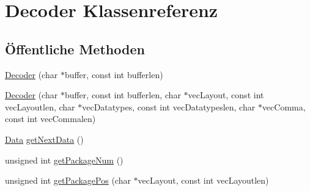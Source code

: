 \hypertarget{classDecoder}{\section{Decoder Klassenreferenz}
\label{classDecoder}
}
\subsection*{Öffentliche Methoden}
\begin{DoxyCompactItemize}
\item 
\hyperlink{classDecoder_a26cf61527451080d86ac5f876d3d1c21}{Decoder} (char $\ast$buffer, const int bufferlen)
\item 
\hyperlink{classDecoder_aec7e24d0fc7ac86886fc7f5de4999ed5}{Decoder} (char $\ast$buffer, const int bufferlen, char $\ast$vec\-Layout, const int vec\-Layoutlen, char $\ast$vec\-Datatypes, const int vec\-Datatypeslen, char $\ast$vec\-Comma, const int vec\-Commalen)
\item 
\hyperlink{classData}{Data} \hyperlink{classDecoder_a822e353ce4fda29290f280d4e3e44305}{get\-Next\-Data} ()
\item 
unsigned int \hyperlink{classDecoder_a28231d06fe2fd5144a939907d6ee509a}{get\-Package\-Num} ()
\item 
unsigned int \hyperlink{classDecoder_aca3dc7a7a1982ac07e1a08a0e4c91955}{get\-Package\-Pos} (char $\ast$vec\-Layout, const int vec\-Layoutlen)
\end{DoxyCompactItemize}


